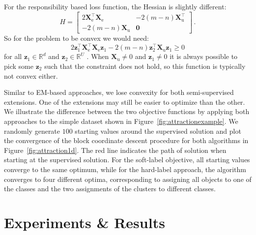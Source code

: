 \documentclass[conference,a4paper,10pt]{IEEEtran}\usepackage[]{graphicx}\usepackage[]{color}
\begin{document}
For the responsibility based loss function, the Hessian is slightly different:
$$
H=\begin{bmatrix} 
2 \mathbf{X}_\text{e}^\top \mathbf{X}_\text{e} & 
-2 (m-n)\mathbf{X}_\text{u}^\top \\
-2 (m-n) \mathbf{X}_\text{u} &
\mathbf{0}
\end{bmatrix} \,.
$$
So for the problem to be convex we would need:
$$
2 \mathbf{z}^\top_1 \mathbf{X}_\text{e}^\top \mathbf{X}_\text{e} \mathbf{z}_1 - 2 (m-n)  \mathbf{z}_2^\top \mathbf{X}_\text{u} \mathbf{z}_1 \geq 0
$$  
for all $\mathbf{z}_1 \in \mathbb{R}^{d}$ and $\mathbf{z}_2 \in \mathbb{R}^{U}$ . When $\mathbf{X}_\text{u}\neq 0$ and $\mathbf{z}_1\neq 0$  it is always possible to pick some $\mathbf{z}_2$ such that the constraint does not hold, so this function is typically not convex either.

Similar to EM-based approaches, we lose convexity for both semi-supervised extensions. One of the extensions may still be easier to optimize than the other. We illustrate the difference between the two objective functions by applying both approaches to the simple dataset shown in Figure~\ref{fig:attractionexample}. We randomly generate $100$ starting values around the supervised solution and plot the convergence of the block coordinate descent procedure for both algorithms in Figure~\ref{fig:attraction1d}. The red line indicates the path of solution when starting at the supervised solution. For the soft-label objective, all starting values converge to the same optimum, while for the hard-label approach, the algorithm converges to four different optima, corresponding to assigning all objects to one of the classes and the two assignments of the clusters to different classes.

\section{Experiments \& Results}
\end{document}
